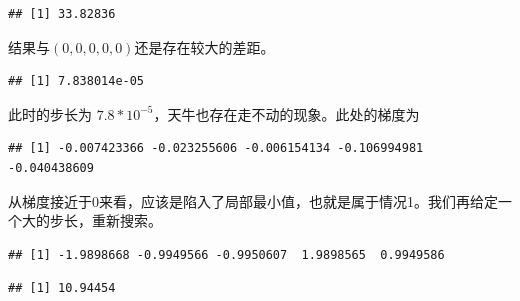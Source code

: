 \documentclass[]{ctexbook}
\newenvironment{Shaded}{\begin{snugshade}}{\end{snugshade}}
\newcommand{\KeywordTok}[1]{\textcolor[rgb]{0.13,0.29,0.53}{\textbf{#1}}}
\newcommand{\DataTypeTok}[1]{\textcolor[rgb]{0.13,0.29,0.53}{#1}}
\newcommand{\DecValTok}[1]{\textcolor[rgb]{0.00,0.00,0.81}{#1}}
\newcommand{\StringTok}[1]{\textcolor[rgb]{0.31,0.60,0.02}{#1}}
\newcommand{\OperatorTok}[1]{\textcolor[rgb]{0.81,0.36,0.00}{\textbf{#1}}}
\newcommand{\NormalTok}[1]{#1}
\begin{document}
\begin{verbatim}
## [1] 33.82836
\end{verbatim}

结果与\((0,0,0,0,0)\)还是存在较大的差距。

\begin{Shaded}
\end{Shaded}

\begin{verbatim}
## [1] 7.838014e-05
\end{verbatim}

此时的步长为 \(7.8*10^{-5}\)，天牛也存在走不动的现象。此处的梯度为

\begin{Shaded}
\end{Shaded}

\begin{verbatim}
## [1] -0.007423366 -0.023255606 -0.006154134 -0.106994981 -0.040438609
\end{verbatim}

从梯度接近于0来看，应该是陷入了局部最小值，也就是属于情况1。我们再给定一个大的步长，重新搜索。

\begin{Shaded}
\end{Shaded}

\begin{verbatim}
## [1] -1.9898668 -0.9949566 -0.9950607  1.9898565  0.9949586
\end{verbatim}

\begin{verbatim}
## [1] 10.94454
\end{verbatim}
\end{document}
